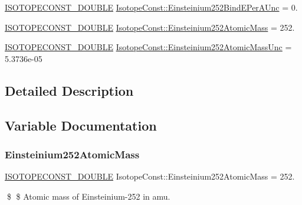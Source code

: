 \begin{DoxyCompactItemize}
\item 
\mbox{\hyperlink{group___isotope_const-_macros_ga8f45a7272ce02c0b4c65c44636ed719a}{I\+S\+O\+T\+O\+P\+E\+C\+O\+N\+S\+T\+\_\+\+D\+O\+U\+B\+LE}} \mbox{\hyperlink{group___isotope_const-_einsteinium-_es252_gad4a3d7192d2378cc544824189ebdc421}{Isotope\+Const\+::\+Einsteinium252\+Bind\+E\+Per\+A\+Unc}} = 0.
\item 
\mbox{\hyperlink{group___isotope_const-_macros_ga8f45a7272ce02c0b4c65c44636ed719a}{I\+S\+O\+T\+O\+P\+E\+C\+O\+N\+S\+T\+\_\+\+D\+O\+U\+B\+LE}} \mbox{\hyperlink{group___isotope_const-_einsteinium-_es252_gadf42e8a739a1e0345fc3911499785d02}{Isotope\+Const\+::\+Einsteinium252\+Atomic\+Mass}} = 252.
\item 
\mbox{\hyperlink{group___isotope_const-_macros_ga8f45a7272ce02c0b4c65c44636ed719a}{I\+S\+O\+T\+O\+P\+E\+C\+O\+N\+S\+T\+\_\+\+D\+O\+U\+B\+LE}} \mbox{\hyperlink{group___isotope_const-_einsteinium-_es252_ga7d0500d5f6c2f28065930ba50640d772}{Isotope\+Const\+::\+Einsteinium252\+Atomic\+Mass\+Unc}} = 5.\+3736e-\/05
\end{DoxyCompactItemize}


\subsection{Detailed Description}


\subsection{Variable Documentation}
\mbox{\label{group___isotope_const-_einsteinium-_es252_gadf42e8a739a1e0345fc3911499785d02}} 
\subsubsection{\texorpdfstring{Einsteinium252\+Atomic\+Mass}{Einsteinium252AtomicMass}}
{\footnotesize\ttfamily \mbox{\hyperlink{group___isotope_const-_macros_ga8f45a7272ce02c0b4c65c44636ed719a}{I\+S\+O\+T\+O\+P\+E\+C\+O\+N\+S\+T\+\_\+\+D\+O\+U\+B\+LE}} Isotope\+Const\+::\+Einsteinium252\+Atomic\+Mass = 252.}

\$ \$ Atomic mass of Einsteinium-\/252 in amu. \mbox{\label{group___isotope_const-_einsteinium-_es252_ga7d0500d5f6c2f28065930ba50640d772}} 
